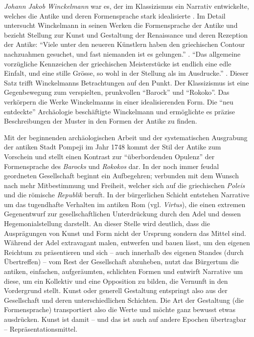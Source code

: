 \documentclass[
    a4paper,
    11pt,
    bibliography=totoc,
    listof=totoc,
    parskip=half,
    headings=normal
]{scrbook}
\begin{document}
\textit{Johann Jakob Winckelmann} war es, der im Klassizismus ein Narrativ entwickelte, welches die Antike und deren Formensprache stark idealisierte \autocite[56]{wurlStudienheftDGUT01Designgeschichte}. Im Detail untersucht Winckelmann in seinen Werken die Formensprache der Antike und bezieht Stellung zur Kunst und Gestaltung der Renaissance und deren Rezeption der Antike: \enquote{Viele unter den neueren Künstlern haben den griechischen Contour nachzuahmen gesuchet, und fast niemanden ist es gelungen.} \autocite[16]{winckelmannGedankenUeberNachahmung1756a}.
\enquote{Das allgemeine vorzügliche Kennzeichen der griechischen Meisterstücke ist endlich eine edle Einfalt, und eine stille Grösse, so wohl in der Stellung als im Ausdrucke.} \autocite[21]{winckelmannGedankenUeberNachahmung1756a}. Dieser Satz trifft Winckelmanns Betrachtungen auf den Punkt. Der Klassizismus ist eine Gegenbewegung zum verspielten, prunkvollen \enquote{Barock} und \enquote{Rokoko}. Das verkörpern die Werke Winckelmanns in einer idealisierenden Form. Die \enquote{neu entdeckte} Archäologie beschäftigte Winckelmann und ermöglichte es präzise Beschreibungen der Muster in den Formen der Antike zu finden.


Mit der beginnenden archäologischen Arbeit und der systematischen Ausgrabung der antiken Stadt Pompeji im Jahr 1748 kommt der Stil der Antike zum Vorschein und stellt einen Kontrast zur \enquote{überbordenden Opulenz} \autocite[56]{wurlStudienheftDGUT01Designgeschichte} der Formensprache des \textit{Barocks} und \textit{Rokokos} dar. In der noch immer feudal geordneten Gesellschaft beginnt ein Aufbegehren; verbunden mit dem Wunsch nach mehr Mitbestimmung und Freiheit, welcher sich auf die griechischen \textit{Poleis} und die römische \textit{Republik} beruft. In der bürgerlichen Schicht entstehen Narrative um das tugendhafte Verhalten im antiken Rom (vgl. \textit{Virtus}), die einen extremen Gegenentwurf zur gesellschaftlichen Unterdrückung durch den Adel und dessen Hegemonialstellung darstellt. An dieser Stelle wird deutlich, dass die Ausprägungen von Kunst und Form nicht der Ursprung sondern das Mittel sind. Während der Adel extravagant malen, entwerfen und bauen lässt, um den eigenen Reichtum zu präsentieren und sich -- auch innerhalb des eigenen Standes (durch Übertreffen) -- vom Rest der Gesellschaft abzuheben, nutzt das Bürgertum die antiken, einfachen, aufgeräumten, schlichten Formen und entwirft Narrative um diese, um ein Kollektiv und eine Opposition zu bilden, die Vernunft in den Vordergrund stellt. Kunst oder generell Gestaltung entspringt also aus der Gesellschaft und deren unterschiedlichen Schichten. Die Art der Gestaltung (die Formensprache) transportiert also die Werte und möchte ganz bewusst etwas ausdrücken. Kunst ist damit -- und das ist auch auf andere Epochen übertragbar -- Repräsentationsmittel.
\end{document}
